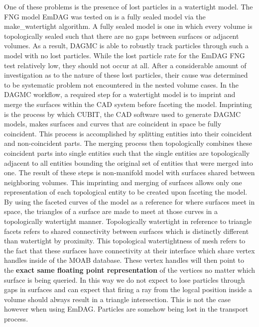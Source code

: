 \documentclass[10pt, a4paper]{article}
\begin{document}
One of these problems is the presence of lost particles in a watertight model. The FNG model EmDAG was tested on is a fully sealed model via the make\_watertight algorithm. A fully sealed model is one in which every volume is topologically sealed such that there are no gaps between surfaces or adjacent volumes. As a result, DAGMC is able to robustly track particles through such a model with no lost particles. While the lost particle rate for the EmDAG FNG test relatively low, they should not occur at all. After a considerable amount of investigation as to the nature of these lost particles, their cause was determined to be systematic problem not encountered in the nested volume cases. In the DAGMC workflow, a required step for a watertight model is to imprint and merge the surfaces within the CAD system before faceting the model. Imprinting is the process by which CUBIT, the CAD software used to generate DAGMC models, makes surfaces and curves that are coincident in space be fully coincident. This process is accomplished by splitting entities into their coincident and non-coincident parts. The merging process then topologically combines these coincident parts into single entities such that the single entities are topologically adjacent to all entities bounding the original set of entities that were merged into one. The result of these steps is non-manifold model with surfaces shared between neighboring volumes. \cite{smith_thesis} This imprinting and merging of surfaces allows only one representation of each topological entity to be created upon faceting the model. By using the faceted curves of the model as a reference for where surfaces meet in space, the triangles of a surface are made to meet at those curves in a topologically watertight manner. Topologically watertight in reference to triangle facets refers to shared connectivity between surfaces which is distinctly different than watertight by proximity. This topological watertightness of mesh refers to the fact that these surfaces have connectivity at their interface which share vertex handles inside of the MOAB database. These vertex handles will then point to the \textbf{exact same floating point representation} of the vertices no matter which surface is being queried. In this way we do not expect to lose particles through gaps in surfaces and can expect that firing a ray from the logcal position inside a volume should always result in a triangle intersection. This is not the case however when using EmDAG. Particles are somehow being lost in the transport process.
\end{document}
